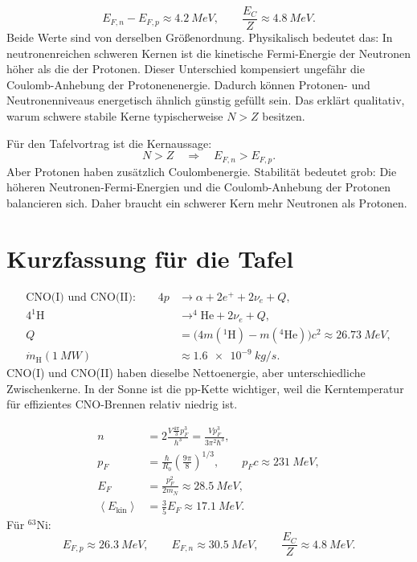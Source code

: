 \documentclass[11pt,a4paper]{scrartcl}
\newcommand{\avg}[1]{\left\langle #1 \right\rangle}
\newcommand{\paren}[1]{\left( #1 \right)}
\newcommand{\isotope}[2]{^{#1}\mathrm{#2}}
\theoremstyle{definition}
\theoremstyle{plain}
\theoremstyle{remark}
\begin{document}
\begin{answerbox}
\[
    \boxed{E_{F,n}-E_{F,p}\approx\SI{4.2}{MeV}},
    \qquad
    \boxed{\frac{E_C}{Z}\approx\SI{4.8}{MeV}}.
\]
Beide Werte sind von derselben Größenordnung. Physikalisch bedeutet das: In neutronenreichen schweren Kernen ist die kinetische Fermi-Energie der Neutronen höher als die der Protonen. Dieser Unterschied kompensiert ungefähr die Coulomb-Anhebung der Protonenenergie. Dadurch können Protonen- und Neutronenniveaus energetisch ähnlich günstig gefüllt sein. Das erklärt qualitativ, warum schwere stabile Kerne typischerweise \(N>Z\) besitzen.
\end{answerbox}

\begin{talkbox}
Für den Tafelvortrag ist die Kernaussage:
\[
    N>Z \quad\Rightarrow\quad E_{F,n}>E_{F,p}.
\]
Aber Protonen haben zusätzlich Coulombenergie. Stabilität bedeutet grob: Die höheren Neutronen-Fermi-Energien und die Coulomb-Anhebung der Protonen balancieren sich. Daher braucht ein schwerer Kern mehr Neutronen als Protonen.
\end{talkbox}

\FloatBarrier
\newpage

\section{Kurzfassung für die Tafel}

\begin{summarybox}[title=Aufgabe 1]
\begin{align*}
    \text{CNO(I) und CNO(II):}\qquad
    4p &\longrightarrow \alpha+2e^++2\nu_e+Q,\\
    4\isotope{1}{H} &\longrightarrow \isotope{4}{He}+2\nu_e+Q,\\
    Q &= \bigl(4m(\isotope{1}{H})-m(\isotope{4}{He})\bigr)c^2\approx\SI{26.73}{MeV},\\
    \dot{m}_{\mathrm H}(\SI{1}{MW})&\approx\SI{1.6e-9}{kg/s}.
\end{align*}
CNO(I) und CNO(II) haben dieselbe Nettoenergie, aber unterschiedliche Zwischenkerne. In der Sonne ist die pp-Kette wichtiger, weil die Kerntemperatur für effizientes CNO-Brennen relativ niedrig ist.
\end{summarybox}

\begin{summarybox}[title=Aufgabe 2]
\begin{align*}
    n &= 2\frac{V\frac{4\pi}{3}p_F^3}{h^3}
      = \frac{Vp_F^3}{3\pi^2\hbar^3},\\
    p_F &= \frac{\hbar}{R_0}\paren{\frac{9\pi}{8}}^{1/3},
    \qquad
    p_Fc\approx\SI{231}{MeV},\\
    E_F &= \frac{p_F^2}{2m_N}\approx\SI{28.5}{MeV},\\
    \avg{E_{\mathrm{kin}}} &= \frac{3}{5}E_F\approx\SI{17.1}{MeV}.
\end{align*}
Für \(\isotope{63}{Ni}\):
\[
    E_{F,p}\approx\SI{26.3}{MeV},
    \qquad
    E_{F,n}\approx\SI{30.5}{MeV},
    \qquad
    \frac{E_C}{Z}\approx\SI{4.8}{MeV}.
\]
\end{summarybox}
\end{document}
